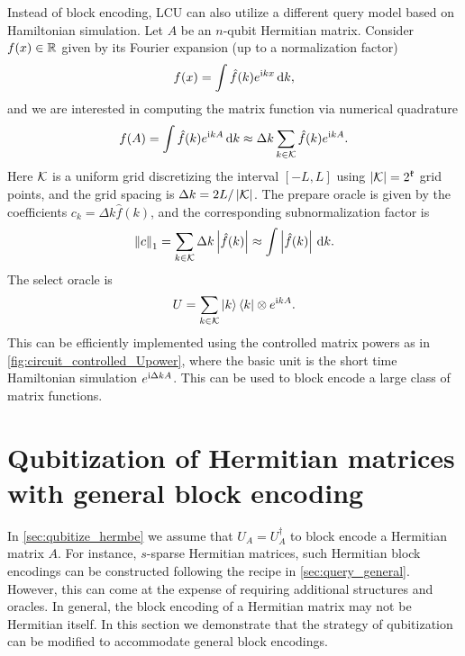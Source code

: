\begin{exam}
Instead of block encoding, LCU can also utilize a different query model based on Hamiltonian simulation.
Let $A$ be an $n$-qubit Hermitian matrix. 
Consider $f(x)\in\mathbb{R}$ given by its Fourier expansion (up to a normalization factor)
\begin{equation}
  f(x)=\int \hat{f}(k) e^{\mathrm{i} kx}\,\mathrm{d} k,
\end{equation}
and we are interested in computing the matrix function via numerical quadrature
\begin{equation}
  f(A)=\int \hat{f}(k) e^{\mathrm{i} kA}\,\mathrm{d} k \approx \Delta k \sum_{k\in \mathcal{K}} \hat{f}(k) e^{\mathrm{i} kA}.
\end{equation}
Here $\mathcal{K}$ is a uniform grid discretizing the interval $[-L,L]$ using $\left\lvert\mathcal{K}\right\rvert=2^{\mathfrak{k}}$ grid points, and the grid spacing is $\Delta k = 2L/\left\lvert\mathcal{K}\right\rvert$. 
The prepare oracle is given by the coefficients $c_k=\Delta k \hat{f}(k)$, and the corresponding subnormalization factor is
\begin{equation}
  \left\lVert c\right\rVert_1=\sum_{k\in\mathcal{K}}\Delta k \left\lvert\hat{f}(k)\right\rvert \approx \int \left\lvert\hat{f}(k)\right\rvert\,\mathrm{d} k.
\end{equation}
The select oracle is
\begin{equation}
  U=\sum_{k\in\mathcal{K}} \ket{k}\bra{k}\otimes e^{\mathrm{i} kA}.
\end{equation}
This can be efficiently implemented using the controlled matrix powers as in \cref{fig:circuit_controlled_Upower}, where the basic unit is the short time Hamiltonian simulation $e^{\mathrm{i} \Delta k A}$.
This can be used to block encode a large class of matrix functions.
\end{exam}

\section{Qubitization of Hermitian matrices with general block encoding}\label{sec:qubitize_genbe}

In \cref{sec:qubitize_hermbe} we assume that $U_A=U_A^{\dag}$ to block encode a Hermitian matrix $A$.
For instance, $s$-sparse Hermitian matrices, such Hermitian block encodings can be constructed following the recipe in \cref{sec:query_general}.
However, this can come at the expense of requiring additional structures and oracles.
In general, the block encoding of a Hermitian matrix may not be Hermitian itself.
In this section we demonstrate that the strategy of qubitization can be modified to accommodate general block encodings.


